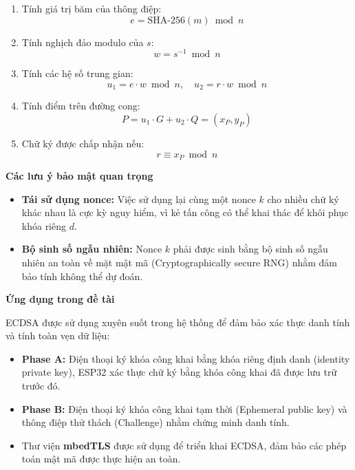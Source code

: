 \begin{enumerate}
    \item Tính giá trị băm của thông điệp:
    \[
    e = \text{SHA-256}(m) \bmod n
    \]
    
    \item Tính nghịch đảo modulo của $s$:
    \[
    w = s^{-1} \bmod n
    \]
    
    \item Tính các hệ số trung gian:
    \[
    u_1 = e \cdot w \bmod n, \quad
    u_2 = r \cdot w \bmod n
    \]
    
    \item Tính điểm trên đường cong:
    \[
    P = u_1 \cdot G + u_2 \cdot Q = (x_P, y_P)
    \]
    
    \item Chữ ký được chấp nhận nếu:
    \[
    r \equiv x_P \bmod n
    \]
\end{enumerate}

\textbf{Các lưu ý bảo mật quan trọng}

\begin{itemize}
    \item \textbf{Tái sử dụng nonce:}  
    Việc sử dụng lại cùng một nonce $k$ cho nhiều chữ ký khác nhau là cực kỳ nguy hiểm, vì kẻ tấn công có thể khai thác để khôi phục khóa riêng $d$.
    
    \item \textbf{Bộ sinh số ngẫu nhiên:}  
    Nonce $k$ phải được sinh bằng bộ sinh số ngẫu nhiên an toàn về mặt mật mã (Cryptographically secure RNG) nhằm đảm bảo tính không thể dự đoán.
\end{itemize}

\textbf{Ứng dụng trong đề tài}
\par\vspace{0.5em}
ECDSA được sử dụng xuyên suốt trong hệ thống để đảm bảo xác thực danh tính và tính toàn vẹn dữ liệu:

\begin{itemize}
    \item \textbf{Phase A:} Điện thoại ký khóa công khai bằng khóa riêng định danh (identity private key), ESP32 xác thực chữ ký bằng khóa công khai đã được lưu trữ trước đó.
    
    \item \textbf{Phase B:} Điện thoại ký khóa công khai tạm thời (Ephemeral public key) và thông điệp thử thách (Challenge) nhằm chứng minh danh tính.
    
    \item Thư viện \textbf{mbedTLS} được sử dụng để triển khai ECDSA, đảm bảo  các phép toán mật mã được thực hiện an toàn.
\end{itemize}

